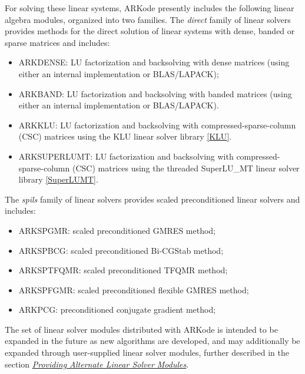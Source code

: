 \documentclass[letterpaper,10pt,english]{sphinxmanual}
\begin{document}
For solving these linear systems, ARKode presently includes the
following linear algebra modules, organized into two families.  The
\emph{direct} family of linear solvers provides methods for the direct
solution of linear systems with dense, banded or sparse matrices and
includes:
\begin{itemize}
\item {} 
ARKDENSE: LU factorization and backsolving with dense matrices
(using either an internal implementation or BLAS/LAPACK);

\item {} 
ARKBAND: LU factorization and backsolving with banded matrices
(using either an internal implementation or BLAS/LAPACK).

\item {} 
ARKKLU: LU factorization and backsolving with
compressed-sparse-column (CSC) matrices using the KLU linear solver
library {\hyperref[References:klu]{{[}KLU{]}}}.

\item {} 
ARKSUPERLUMT: LU factorization and backsolving with
compressed-sparse-column (CSC) matrices using the threaded
SuperLU\_MT linear solver library {\hyperref[References:superlumt]{{[}SuperLUMT{]}}}.

\end{itemize}

The \emph{spils} family of linear solvers provides scaled preconditioned
linear solvers and includes:
\begin{itemize}
\item {} 
ARKSPGMR: scaled preconditioned GMRES method;

\item {} 
ARKSPBCG: scaled preconditioned Bi-CGStab method;

\item {} 
ARKSPTFQMR: scaled preconditioned TFQMR method;

\item {} 
ARKSPFGMR: scaled preconditioned flexible GMRES method;

\item {} 
ARKPCG: preconditioned conjugate gradient method;

\end{itemize}

The set of linear solver modules distributed with ARKode is
intended to be expanded in the future as new algorithms are developed,
and may additionally be expanded through user-supplied linear solver
modules, further described in the section {\hyperref[linear_solvers/custom:linearsolvers-custom]{\emph{Providing Alternate Linear Solver Modules}}}.
\end{document}
